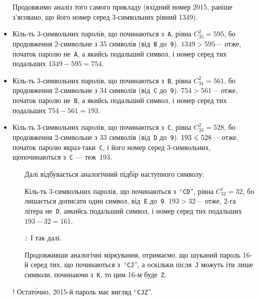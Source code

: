 \begin{small}
\begin{itemize}
\item[] Продовжимо аналіз того самого прикладу (вхідний номер 2015, раніше з’ясовано, що його номер серед 3-символьних рівний 1349).

\item Кіль-ть 3-символьних паролів, що починаються з~\texttt{A}, рівна ${C_{35}^2 = 595}$, бо продовження %
2-символьне з 35 символів (від~\texttt{B} до~\texttt{9}). ${1349>595}$\nolinebreak[3] --- отже, початок паролю не~\texttt{A}, а якийсь подальший символ, і номер %
серед тих подальших ${1349-595=754}$.

\item Кіль-ть 3-символьних паролів, що починаються з~\texttt{B}, рівна ${C_{34}^2 = 561}$, бо продовження %
2-символьне з 34 символів (від~\texttt{C} до~\texttt{9}). ${754>561}$\nolinebreak[3] --- отже, початок паролю не~\texttt{B}, а якийсь подальший символ, і номер %
серед тих подальших ${754-561=193}$.

\item Кіль-ть 3-символьних паролів, що починаються з~\texttt{C}, рівна ${C_{33}^2 = 528}$, бо продовження %
2-символьне з 33 символів (від~\texttt{D} до~\texttt{9}). ${193\leqslant528}$\nolinebreak[3] --- отже, початок паролю якраз-таки~\texttt{C}, і його номер серед 3-символьних, що\nolinebreak[3] починаються з~\texttt{C} --- теж~193.

\begin{itemize}
\item[] Далі відбувається аналогічний підбір наступного символу:

\item[\textopenbullet] Кіль-ть 3-символьних паролів, що починаються з~``\texttt{CD}'', рівна ${C_{32}^1=32}$, бо лишається дописати один символ, від~\texttt{E} до~\texttt{9}. ${193>32}$\nolinebreak[3] --- отже, 2-га літера не~\texttt{D}, а\nolinebreak[3] якийсь подальший символ, і номер %
серед тих подальших ${193-32=161}$.

\item[$\isdiv$] І так далі.

\item[\textopenbullet] Продовживши аналогічні міркування, отримаємо, що шуканий пароль 16-й серед тих, що починаються з~``\texttt{CJ}'', а оскільки після~\texttt{J} можуть іти лише символи, починаючи з~\texttt{K}, то цим 16-м буде~\texttt{Z}.
\end{itemize}

\item[!] Остат\'{о}чно, 2015-й пароль має вигляд ``\texttt{CJZ}''.
\end{itemize}
\end{small}

